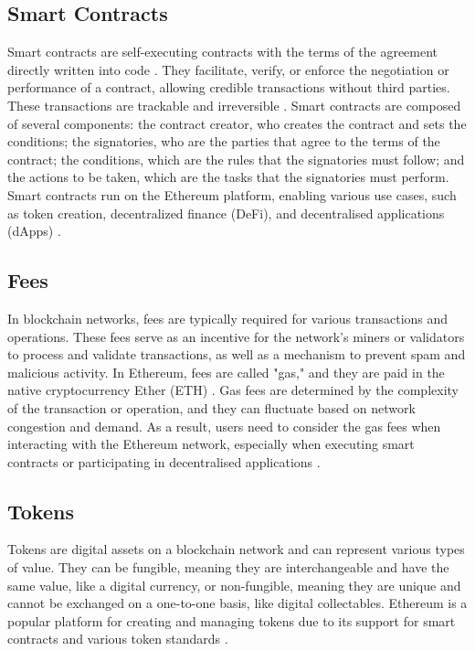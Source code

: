 \subsection{Smart Contracts}
Smart contracts are self-executing contracts with the terms of the agreement directly written into code \cite{szabo1997formalizing}. They facilitate, verify, or enforce the negotiation or performance of a contract, allowing credible transactions without third parties. These transactions are trackable and irreversible \cite{kosba2016hawk}. 
Smart contracts are composed of several components: the contract creator, who creates the contract and sets the conditions; the signatories, who are the parties that agree to the terms of the contract; the conditions, which are the rules that the signatories must follow; and the actions to be taken, which are the tasks that the signatories must perform. Smart contracts run on the Ethereum platform, enabling various use cases, such as token creation, decentralized finance (DeFi), and decentralised applications (dApps) \cite{mougayar2016business2}.

\subsection{Fees}
In blockchain networks, fees are typically required for various transactions and operations. These fees serve as an incentive for the network's miners or validators to process and validate transactions, as well as a mechanism to prevent spam and malicious activity. In Ethereum, fees are called "gas," and they are paid in the native cryptocurrency Ether (ETH) \cite{wood2014ethereum}. Gas fees are determined by the complexity of the transaction or operation, and they can fluctuate based on network congestion and demand. As a result, users need to consider the gas fees when interacting with the Ethereum network, especially when executing smart contracts or participating in decentralised applications \cite{wood2014ethereum}.

\subsection{Tokens}
Tokens are digital assets on a blockchain network and can represent various types of value. They can be fungible, meaning they are interchangeable and have the same value, like a digital currency, or non-fungible, meaning they are unique and cannot be exchanged on a one-to-one basis, like digital collectables. Ethereum is a popular platform for creating and managing tokens due to its support for smart contracts and various token standards \cite{vogelsteller2015erc20}.

